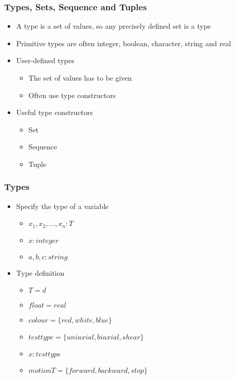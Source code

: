 \documentclass[t,12pt,numbers,fleqn]{beamer}
\begin{document}

\begin{frame}
\frametitle{Types, Sets, Sequence and Tuples}
\begin{itemize}
\item A type is a set of values, so any precisely defined set is a type
\item Primitive types are often integer, boolean, character, string and real
\item User-defined types
\begin{itemize}
\item The set of values has to be given
\item Often use type constructors
\end{itemize}
\item Useful type constructors
\begin{itemize}
\item Set
\item Sequence
\item Tuple
\end{itemize}
\end{itemize}
\end{frame}


\begin{frame}
\frametitle{Types}
\begin{itemize}
\item Specify the type of a variable
\begin{itemize}
\item $x_1, x_2, ..., x_n : T$
\item $x: integer$
\item $a, b, c: string$
\end{itemize}
\item Type definition
\begin{itemize}
\item $T = d$
\item $float = real$
\item $colour = \{red, white, blue \}$
\item $testtype = \{uniaxial, biaxial, shear \}$
\item $x: testtype$
\item $motionT = \{ forward, backward, stop \}$
\end{itemize}
\end{itemize}
\end{frame}
\end{document}
